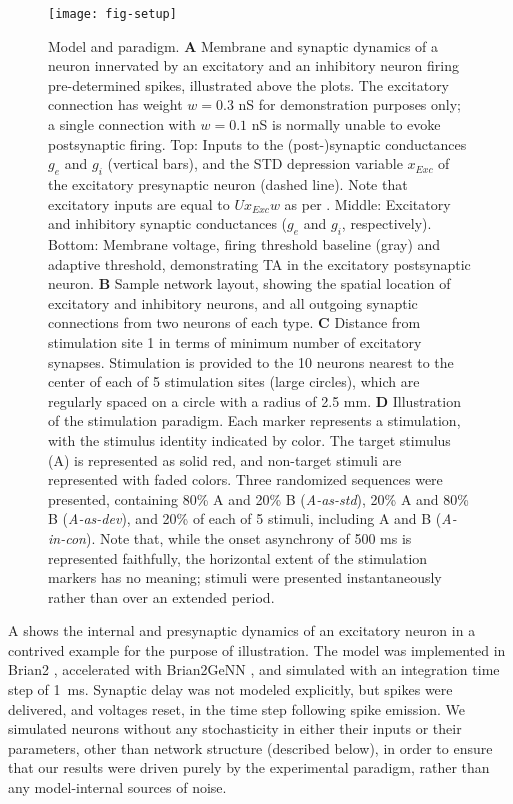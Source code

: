 \documentclass[9pt,lineno,onehalfspacing]{elife}
\newcommand{\dev}{\textit{A-as-dev}}
\newcommand{\msc}{\textit{A-in-con}}
\newcommand{\std}{\textit{A-as-std}}
\begin{document}
\begin{figure}
    \texttt{[image: fig-setup]}
    \caption{%
        Model and paradigm.
        \textbf{A} Membrane and synaptic dynamics of a neuron innervated by an excitatory and an inhibitory neuron firing pre-determined spikes, illustrated above the plots. The excitatory connection has weight $w = 0.3$ nS for demonstration purposes only; a single connection with $w = 0.1$ nS is normally unable to evoke postsynaptic firing. Top: Inputs to the (post-)synaptic conductances $g_e$ and $g_i$ (vertical bars), and the STD depression variable $x_{Exc}$ of the excitatory presynaptic neuron (dashed line). Note that excitatory inputs are equal to $U x_{Exc} w$ as per . Middle: Excitatory and inhibitory synaptic conductances ($g_e$ and $g_i$, respectively). Bottom: Membrane voltage, firing threshold baseline (gray) and adaptive threshold, demonstrating TA in the excitatory postsynaptic neuron.
        \textbf{B} Sample network layout, showing the spatial location of excitatory and inhibitory neurons, and all outgoing synaptic connections from two neurons of each type.
        \textbf{C} Distance from stimulation site 1 in terms of minimum number of excitatory synapses. Stimulation is provided to the 10 neurons nearest to the center of each of 5 stimulation sites (large circles), which are regularly spaced on a circle with a radius of 2.5 mm.
        \textbf{D} Illustration of the stimulation paradigm. Each marker represents a stimulation, with the stimulus identity indicated by color. The target stimulus (A) is represented as solid red, and non-target stimuli are represented with faded colors. Three randomized sequences were presented, containing 80\% A and 20\% B (\std{}), 20\% A and 80\% B (\dev{}), and 20\% of each of 5 stimuli, including A and B (\msc{}). Note that, while the onset asynchrony of 500 ms is represented faithfully, the horizontal extent of the stimulation markers has no meaning; stimuli were presented instantaneously rather than over an extended period.
    }
    \label{fig:setup}
\end{figure}

A shows the internal and presynaptic dynamics of an excitatory neuron in a contrived example for the purpose of illustration. The model was implemented in Brian2 \citep{Stimberg2019-tc}, accelerated with Brian2GeNN \citep{Stimberg2020-go}, and simulated with an integration time step of 1~ms. Synaptic delay was not modeled explicitly, but spikes were delivered, and voltages reset, in the time step following spike emission. We simulated neurons without any stochasticity in either their inputs or their parameters, other than network structure (described below), in order to ensure that our results were driven purely by the experimental paradigm, rather than any model-internal sources of noise.
\end{document}
